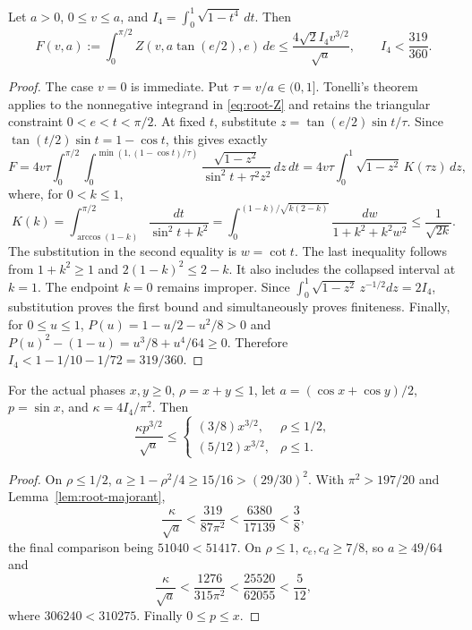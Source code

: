 \begin{lemma}\label{lem:root-majorant}
Let $a>0$, $0\leq v\leq a$, and
$I_4=\int_0^1\sqrt{1-t^4}\,dt$. Then
\begin{equation}\label{eq:F-root-bound}
 F(v,a):=\int_0^{\pi/2}Z(v,a\tan(e/2),e)\,de
       \leq\frac{4\sqrt2 I_4v^{3/2}}{\sqrt a},
 \qquad I_4<\frac{319}{360}.
\end{equation}
\end{lemma}
\begin{proof}
The case $v=0$ is immediate. Put $\tau=v/a\in(0,1]$. Tonelli's theorem
applies to the nonnegative integrand in \eqref{eq:root-Z} and retains
the triangular constraint $0<e<t<\pi/2$. At fixed $t$, substitute
$z=\tan(e/2)\sin t/\tau$. Since
$\tan(t/2)\sin t=1-\cos t$, this gives exactly
\[
 F=4v\tau\int_0^{\pi/2}
    \int_0^{\min(1,(1-\cos t)/\tau)}
       \frac{\sqrt{1-z^2}}{\sin^2t+\tau^2z^2}\,dz\,dt
   =4v\tau\int_0^1\sqrt{1-z^2}\,K(\tau z)\,dz,
\]
where, for $0<k\leq1$,
\[
 K(k)=\int_{\arccos(1-k)}^{\pi/2}\frac{dt}{\sin^2t+k^2}
 =\int_0^{(1-k)/\sqrt{k(2-k)}}\frac{dw}{1+k^2+k^2w^2}
 \leq\frac1{\sqrt{2k}}.
\]
The substitution in the second equality is $w=\cot t$. The last
inequality follows from $1+k^2\geq1$ and
$2(1-k)^2\leq2-k$. It also includes the collapsed interval at $k=1$.
The endpoint $k=0$ remains improper. Since
$\int_0^1\sqrt{1-z^2}\,z^{-1/2}dz=2I_4$, substitution proves the first
bound and simultaneously proves finiteness. Finally, for $0\leq u\leq1$,
$P(u)=1-u/2-u^2/8>0$ and
$P(u)^2-(1-u)=u^3/8+u^4/64\geq0$. Therefore
$I_4<1-1/10-1/72=319/360$.
\end{proof}

\begin{corollary}\label{cor:root-rational-constants}
For the actual phases $x,y\geq0$, $\rho=x+y\leq1$, let
$a=(\cos x+\cos y)/2$, $p=\sin x$, and $\kappa=4I_4/\pi^2$.
Then
\[
 \frac{\kappa p^{3/2}}{\sqrt a}\leq
 \begin{cases}(3/8)x^{3/2},&\rho\leq1/2,\\
               (5/12)x^{3/2},&\rho\leq1.
 \end{cases}
\]
\end{corollary}
\begin{proof}
On $\rho\leq1/2$, $a\geq1-\rho^2/4\geq15/16>(29/30)^2$.
With $\pi^2>197/20$ and Lemma~\ref{lem:root-majorant},
\[
 \frac\kappa{\sqrt a}<\frac{319}{87\pi^2}
               <\frac{6380}{17139}<\frac38,
\]
the final comparison being $51040<51417$. On $\rho\leq1$,
$c_e,c_d\geq7/8$, so $a\geq49/64$ and
\[
 \frac\kappa{\sqrt a}<\frac{1276}{315\pi^2}
               <\frac{25520}{62055}<\frac5{12},
\]
where $306240<310275$. Finally $0\leq p\leq x$.
\end{proof}

